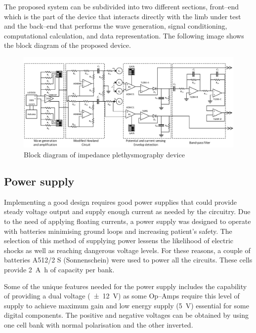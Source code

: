 The proposed system can be subdivided into two different sections, front–end which is the part of the device that interacts directly with the limb under test and the back–end that performs the wave generation, signal conditioning, computational calculation, and data representation. The following image shows the block diagram of the proposed device.

\begin{figure}[!htpb]
	\centering
	\includegraphics[width=\textwidth,keepaspectratio]{figure2}
    \caption{Block diagram of impedance plethysmography device}
    \label{fig:block}
\end{figure}


\subsection{Power supply}
Implementing a good design requires good power supplies that could provide steady voltage output and supply enough current as needed by the circuitry. Due to the need of applying floating currents, a power supply was designed to operate with batteries minimising ground loops and increasing patient's safety.  The selection of this method of supplying power lessens the likelihood of electric shocks as well as reaching dangerous voltage levels. For these reasons, a couple of batteries A512/2 S (Sonnenschein) were used to power all the circuits. These cells provide \SI{2}{\ampere\hour} of capacity per bank.

Some of the unique features needed for the power supply includes the capability of providing a dual voltage (\SI{\pm 12}{\volt}) as some Op–Amps require this level of supply to achieve maximum gain and low energy supply (\SI{5}{\volt}) essential for some digital components. The positive and negative voltages can be obtained by using one cell bank with normal polarisation and the other inverted. 

